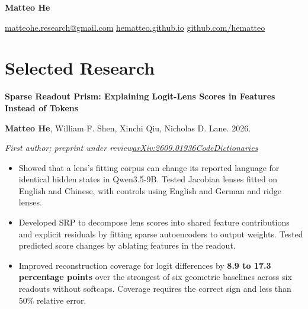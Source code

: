\documentclass[letterpaper,11pt]{article}
\newcommand{\paper}[3]{\par\addvspace{7pt}\textbf{#1}\par{\fontsize{9.7}{11.3}\selectfont #2\par\textit{#3}\par}\nopagebreak}
\begin{document}
\begin{center}
{\LARGE\bfseries Matteo He}\par\vspace{2pt}
\small
\href{mailto:matteohe.research@gmail.com}{matteohe.research@gmail.com}\enspace\textbar\enspace
\href{https://hematteo.github.io/}{hematteo.github.io}\enspace\textbar\enspace
\href{https://github.com/hematteo}{github.com/hematteo}
\end{center}
\vspace{-6pt}
\fontsize{10.5}{12.5}\selectfont

\section{Selected Research}
\paper{Sparse Readout Prism: Explaining Logit-Lens Scores in Features Instead of Tokens}
{\textbf{Matteo He}, William F. Shen, Xinchi Qiu, Nicholas D. Lane. 2026.}
{First author; preprint under review\enspace\textbar\enspace\href{https://arxiv.org/abs/2609.01936}{arXiv:2609.01936}\enspace\textbar\enspace\href{https://github.com/hematteo/sparse-readout-prism}{Code}\enspace\textbar\enspace\href{https://huggingface.co/hematteo/sparse-readout-prism}{Dictionaries}}
\begin{itemize}
\item Showed that a lens's fitting corpus can change its reported language for identical hidden states in Qwen3.5-9B. Tested Jacobian lenses fitted on English and Chinese, with controls using English and German and ridge lenses.
\item Developed SRP to decompose lens scores into shared feature contributions and explicit residuals by fitting sparse autoencoders to output weights. Tested predicted score changes by ablating features in the readout.
\item Improved reconstruction coverage for logit differences by \textbf{8.9 to 17.3 percentage points} over the strongest of six geometric baselines across six readouts without softcaps. Coverage requires the correct sign and less than 50\% relative error.
\end{itemize}
\end{document}
